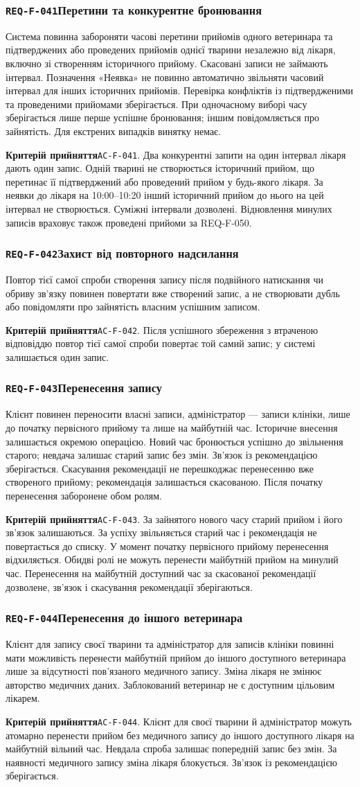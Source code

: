 \documentclass[11pt,a4paper]{article}
\newcommand{\requirement}[4]{%
  \Needspace{7\baselineskip}%
  \subsubsection*{\hypertarget{#1}{\texttt{#1}}\quad #2}%
  #3\par
  \textbf{Критерій прийняття}\quad #4\par\medskip}
\begin{document}
\requirement{REQ-F-041}{Перетини та конкурентне бронювання}{Система повинна забороняти часові перетини прийомів одного ветеринара та підтверджених або проведених прийомів однієї тварини незалежно від лікаря, включно зі створенням історичного прийому. Скасовані записи не займають інтервал. Позначення «Неявка» не повинно автоматично звільняти часовий інтервал для інших історичних прийомів. Перевірка конфліктів із підтвердженими та проведеними прийомами зберігається. При одночасному виборі часу зберігається лише перше успішне бронювання; іншим повідомляється про зайнятість. Для екстрених випадків винятку немає.}{\hypertarget{AC-F-041}{\texttt{AC-F-041}}. Два конкурентні запити на один інтервал лікаря дають один запис. Одній тварині не створюється історичний прийом, що перетинає її підтверджений або проведений прийом у будь-якого лікаря. За неявки до лікаря на 10:00–10:20 інший історичний прийом до нього на цей інтервал не створюється. Суміжні інтервали дозволені. Відновлення минулих записів враховує також проведені прийоми за REQ-F-050.}

\requirement{REQ-F-042}{Захист від повторного надсилання}{Повтор тієї самої спроби створення запису після подвійного натискання чи обриву зв’язку повинен повертати вже створений запис, а не створювати дубль або повідомляти про зайнятість власним успішним записом.}{\hypertarget{AC-F-042}{\texttt{AC-F-042}}. Після успішного збереження з втраченою відповіддю повтор тієї самої спроби повертає той самий запис; у системі залишається один запис.}

\requirement{REQ-F-043}{Перенесення запису}{Клієнт повинен переносити власні записи, адміністратор — записи клініки, лише до початку первісного прийому та лише на майбутній час. Історичне внесення залишається окремою операцією. Новий час бронюється успішно до звільнення старого; невдача залишає старий запис без змін. Зв’язок із рекомендацією зберігається. Скасування рекомендації не перешкоджає перенесенню вже створеного прийому; рекомендація залишається скасованою. Після початку перенесення заборонене обом ролям.}{\hypertarget{AC-F-043}{\texttt{AC-F-043}}. За зайнятого нового часу старий прийом і його зв’язок залишаються. За успіху звільняється старий час і рекомендація не повертається до списку. У момент початку первісного прийому перенесення відхиляється. Обидві ролі не можуть перенести майбутній прийом на минулий час. Перенесення на майбутній доступний час за скасованої рекомендації дозволене, зв’язок і скасування рекомендації зберігаються.}

\requirement{REQ-F-044}{Перенесення до іншого ветеринара}{Клієнт для запису своєї тварини та адміністратор для записів клініки повинні мати можливість перенести майбутній прийом до іншого доступного ветеринара лише за відсутності пов’язаного медичного запису. Зміна лікаря не змінює авторство медичних даних. Заблокований ветеринар не є доступним цільовим лікарем.}{\hypertarget{AC-F-044}{\texttt{AC-F-044}}. Клієнт для своєї тварини й адміністратор можуть атомарно перенести прийом без медичного запису до іншого доступного лікаря на майбутній вільний час. Невдала спроба залишає попередній запис без змін. За наявності медичного запису зміна лікаря блокується. Зв’язок із рекомендацією зберігається.}
\end{document}
